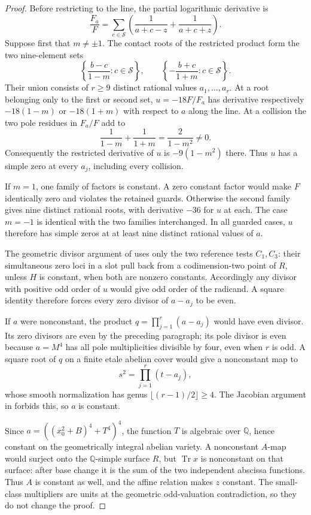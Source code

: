 \documentclass[11pt,a4paper]{article}
\newcommand{\Q}{\mathbb Q}
\DeclareMathOperator{\Tr}{Tr}
\begin{document}
\begin{proof}
Before restricting to the line, the partial logarithmic derivative is
\[
 \frac{F_a}{F}=\sum_{c\in\mathcal S}
       \left(\frac1{a+c-z}+\frac1{a+c+z}\right).
\]
Suppose first that $m\ne\pm1$. The contact roots of the restricted
product form the two nine-element sets
\[
 \left\{\frac{b-c}{1-m}:c\in\mathcal S\right\},\qquad
 \left\{-\frac{b+c}{1+m}:c\in\mathcal S\right\}.
\]
Their union consists of $r\ge9$ distinct rational values
$a_1,\ldots,a_r$. At a root belonging only to the first or
second set, $u=-18F/F_a$ has derivative respectively
$-18(1-m)$ or $-18(1+m)$ with respect to $a$ along the line.
At a collision the two pole residues in $F_a/F$ add to
\[
             \frac1{1-m}+\frac1{1+m}=\frac2{1-m^2}\ne0.
\]
Consequently the restricted derivative of $u$ is
$-9(1-m^2)$ there. Thus $u$ has a simple zero at every $a_j$,
including every collision.

If $m=1$, one family of factors is constant. A zero constant
factor would make $F$ identically zero and violates the retained
guards. Otherwise the second family gives nine distinct rational
roots, with derivative $-36$ for $u$ at each. The case $m=-1$
is identical with the two families interchanged. In all guarded
cases, $u$ therefore has simple zeros at at least nine distinct
rational values of $a$.

The geometric divisor argument of \cite{Families} uses only the
two reference tests $C_1,C_3$: their simultaneous zero loci in a
slot pull back from a codimension-two point of $R$, unless $H$
is constant, when both are nonzero constants. Accordingly any
divisor with positive odd order of $u$ would give odd order of
the radicand. A square identity therefore forces every zero
divisor of $a-a_j$ to be even.

If $a$ were nonconstant, the product
$q=\prod_{j=1}^r(a-a_j)$ would have even divisor. Its zero
divisors are even by the preceding paragraph; its pole divisor
is even because $a=M^4$ has all pole multiplicities divisible by
four, even when $r$ is odd. A square root of $q$ on a finite etale
abelian cover would give a nonconstant map to
\[
                         s^2=\prod_{j=1}^r(t-a_j),
\]
whose smooth normalization has genus
$\lfloor(r-1)/2\rfloor\ge4$. The Jacobian argument in
\cite{Families} forbids this, so $a$ is constant.

Since $a=((x_0^2+B)^4+T^4)^4$, the function $T$ is algebraic
over $\Q$, hence constant on the geometrically integral abelian
variety. A nonconstant $A$-map would surject onto the $\Q$-simple
surface $R$, but $\Tr x$ is nonconstant on that surface: after
base change it is the sum of the two independent abscissa functions.
Thus $A$ is constant as well, and the affine relation makes $z$
constant. The small-class multipliers are units at the geometric
odd-valuation contradiction, so they do not change the proof.
\end{proof}
\end{document}
